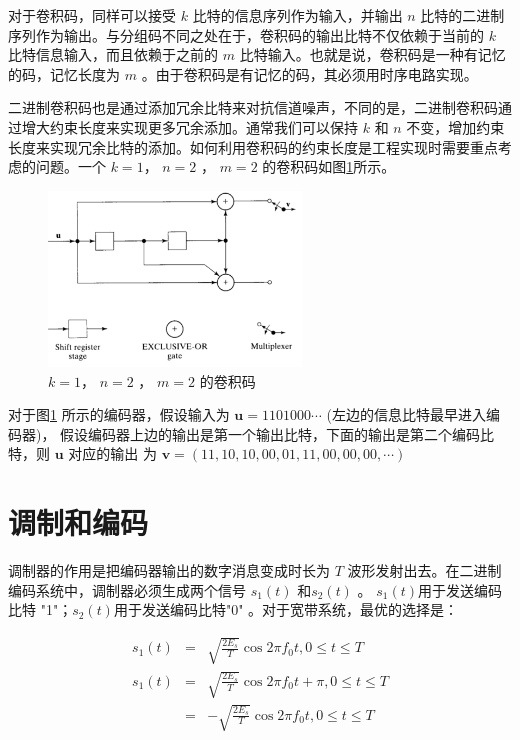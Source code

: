 \documentclass[10pt,a4paper,UTF8]{article}
\begin{document}
对于卷积码，同样可以接受 \(k\) 比特的信息序列作为输入，并输出 \(n\) 比特的二进制序列作为输出。与分组码不同之处在于，卷积码的输出比特不仅依赖于当前的 \(k\) 比特信息输入，而且依赖于之前的 \(m\) 比特输入。也就是说，卷积码是一种有记忆的码，记忆长度为 \(m\) 。由于卷积码是有记忆的码，其必须用时序电路实现。

二进制卷积码也是通过添加冗余比特来对抗信道噪声，不同的是，二进制卷积码通过增大约束长度来实现更多冗余添加。通常我们可以保持 \(k\) 和 \(n\) 不变，增加约束长度来实现冗余比特的添加。如何利用卷积码的约束长度是工程实现时需要重点考虑的问题。一个 \(k=1\)， \(n=2\) ， \(m=2\) 的卷积码如图\ref{fig:orgparagraph4}所示。
\begin{figure}[htb]
\centering
\includegraphics[width=0.6\textwidth]{../../img/20161113fig01_03.png}
\caption{\label{fig:orgparagraph4}
\(k=1\)， \(n=2\) ， \(m=2\) 的卷积码}
\end{figure}

对于图\ref{fig:orgparagraph4} 所示的编码器，假设输入为 \(\mathbf{u} = 1101000\cdots\) (左边的信息比特最早进入编码器)， 假设编码器上边的输出是第一个输出比特，下面的输出是第二个编码比特，则 \(\mathbf{u}\) 对应的输出
为 \(\mathbf{v} = (11,10,10,00,01,11,00,00,00,\cdots)\)
\section{调制和编码}
\label{sec:orgheadline3}


调制器的作用是把编码器输出的数字消息变成时长为 \(T\) 波形发射出去。在二进制编码系统中，调制器必须生成两个信号 \(s_{1}(t)\) 和\(s_{2}(t)\) 。 \(s_{1}(t)\)用于发送编码比特 "1"；\(s_{2}(t)\)用于发送编码比特"0" 。对于宽带系统，最优的选择是：

\begin{eqnarray*}
s_{1}(t)&=& \sqrt{\frac{2E_{s}}{T}}\cos{2\pi f_{0}t}, 0\leq t\leq T \\
s_{1}(t)&=& \sqrt{\frac{2E_{s}}{T}}\cos{2\pi f_{0}t + \pi}, 0\leq t\leq T \\
        &=& -\sqrt{\frac{2E_{s}}{T}}\cos{2\pi f_{0}t}, 0\leq t\leq T \\
\end{eqnarray*}
\end{document}
